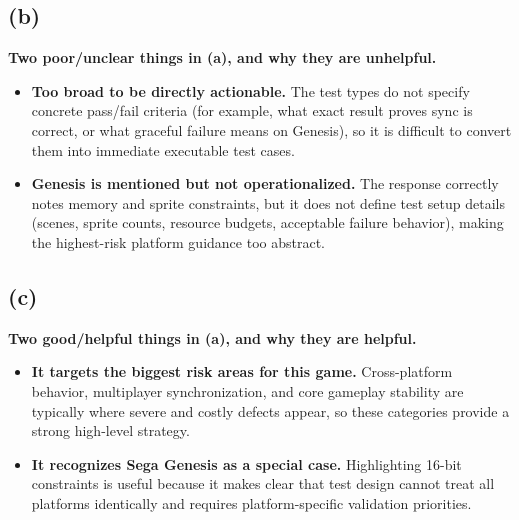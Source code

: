 \subsection{(b)}
\textbf{Two poor/unclear things in (a), and why they are unhelpful.}
\begin{itemize}
    \item \textbf{Too broad to be directly actionable.} The test types do not specify concrete pass/fail criteria (for example, what exact result proves sync is correct, or what graceful failure means on Genesis), so it is difficult to convert them into immediate executable test cases.
    \item \textbf{Genesis is mentioned but not operationalized.} The response correctly notes memory and sprite constraints, but it does not define test setup details (scenes, sprite counts, resource budgets, acceptable failure behavior), making the highest-risk platform guidance too abstract.
\end{itemize}

\subsection{(c)}
\textbf{Two good/helpful things in (a), and why they are helpful.}
\begin{itemize}
    \item \textbf{It targets the biggest risk areas for this game.} Cross-platform behavior, multiplayer synchronization, and core gameplay stability are typically where severe and costly defects appear, so these categories provide a strong high-level strategy.
    \item \textbf{It recognizes Sega Genesis as a special case.} Highlighting 16-bit constraints is useful because it makes clear that test design cannot treat all platforms identically and requires platform-specific validation priorities.
\end{itemize}


